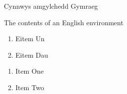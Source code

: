 \documentclass{article}
\begin{document}
\begin{twocol}


\sync
{}

\begin{cymraeg}
Cynnwys amgylchedd Gymraeg
\end{cymraeg}

\begin{english}
The contents of an English environment
\end{english}

\sync
{}


\begin{cymraeg}
\begin{enumerate}
\item Eitem Un 
\item Eitem Dau
\end{enumerate}
\end{cymraeg}
\begin{english}
\begin{enumerate}
\item Item One 
\item Item Two
\end{enumerate}
\end{english}


\end{twocol}
\end{document}
